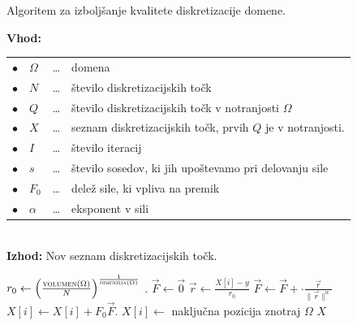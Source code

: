 \documentclass[12pt,a4paper]{article}
\theoremstyle{definition} %
\theoremstyle{plain} %
\begin{document}
\begin{algorithm}[!ht]
  \caption{Algoritem za izboljšanje kvalitete diskretizacije domene.}
  \textbf{Vhod:} \\
  \newcommand{\listbullet}{\hspace*{10pt}$\bullet$\hspace*{-5pt}}
  \begin{tabular}{llll}
    \listbullet & $\Omega$  & \ldots & domena \\
    \listbullet & $N$       & \ldots & število diskretizacijskih točk \\
    \listbullet & $Q$       & \ldots & število diskretizacijskih točk v
    notranjosti $\Omega$ \\
    \listbullet & $X$       & \ldots & seznam diskretizacijskih točk, prvih $Q$
    je v notranjosti. \\
    \listbullet & $I$       & \ldots & število iteracij \\
    \listbullet & $s$       & \ldots & število sosedov, ki jih upoštevamo pri delovanju sile \\
    \listbullet & $F_0$     & \ldots & delež sile, ki vpliva na premik \\
    \listbullet & $\alpha$  & \ldots & eksponent v sili                \\
  \end{tabular} \\
  \textbf{Izhod:} Nov seznam diskretizacijskih točk.
  \label{alg:relax}
  \begin{algorithmic}[1]
    \State $r_0 \gets \left( \frac{\textsc{volumen}(\Omega)}{N}
    \right)^{\frac{1}{\textsc{dimenzija}(\Omega)}}$ .
    \State $\vec{F} \gets \vec{0}$
    \State $\vec{r} \gets \frac{X[i] - y}{r_0}$ 
    \State $\vec{F} \gets \vec{F} + \cdot \frac{\vec{r}}{\|\vec{r}\|^\alpha}$
    \EndFor
    \State $X[i] \gets X[i] + F_0 \vec{F}$.
    \State $X[i] \gets $ naključna pozicija znotraj $\Omega$
    \EndIf
    \EndFor
    \EndFor
    \State \Return $X$
    \EndFunction
  \end{algorithmic}
\end{algorithm}
\end{document}
